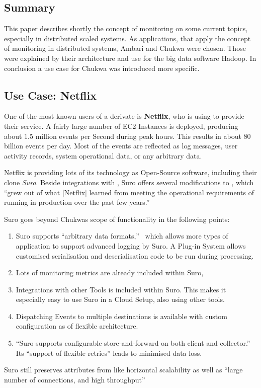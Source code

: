 \subsection{Summary}
This paper describes shortly the concept of monitoring on some current topics, especially in distributed scaled systems. As applications, that apply the concept of monitoring in distributed systems, Ambari and Chukwa were chosen. Those were explained by their architecture and use for the big data software Hadoop. In conclusion a use case for Chukwa was introduced more specific. 

\subsection{Use Case: Netflix}
One of the most known users of a \chuk derivate is \textbf{Netflix}, who is using \aws to provide their service. A fairly large number of \aws EC2 Instances is deployed, producing about $1.5$ million events per Second during peak hours. This results in about $80$ billion events per day. Most of the events are reflected as log messages, user activity records, system operational data, or any arbitrary data.~\cite{Bae2013}

Netflix is providing lots of its technology as Open-Source software, including their \chuk clone \textit{Suro}. 
Beside integrations with \noss, Suro offers several modifications to \chuk, which ``grew out of what [Netflix] learned from meeting the operational requirements of running in production over the past few years.''~\cite{Bae2013}

Suro goes beyond Chukwas scope of functionality in the following points:
\begin{enumerate}
  \item Suro supports ``arbitrary data formats,''~\cite{Bae2013} which allows more types of application to support advanced logging by Suro. A Plug-in System allows customised serialisation and deserialisation code to be run during processing.
  \item Lots of monitoring metrics are already included within Suro, 
  \item Integrations with other \noss Tools is included within Suro. This makes it especially easy to use Suro in a Cloud Setup, also using other \noss tools.~\cite{GithubNetflixSuro}
  \item \label{itm:SutoMultiDest} Dispatching Events to multiple destinations is available with custom configuration as of flexible architecture.~\cite{Bae2013, GithubNetflixSuro} 
  \item ``Suro supports configurable store-and-forward on both client and collector.''~\cite{Bae2013} Its ``support of flexible retries'' leads to minimised data loss.~\cite{GithubNetflixSuro}
\end{enumerate}
Suro still preserves attributes from \chuk like horizontal scalability as well as ``large number of connections, and high throughput''~\cite{GithubNetflixSuro}

